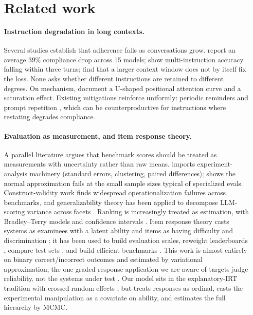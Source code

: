 \documentclass{llncs}
\begin{document}
\section{Related work}
\label{sec:related}

\paragraph{Instruction degradation in long contexts.}
Several studies establish that adherence falls as conversations grow.
\textcite{laban2025} report an average 39\% compliance drop across 15
models; \textcite{he2024} show multi-instruction accuracy falling within
three turns; \textcite{du2025} find that a larger context window does not by
itself fix the loss. None asks whether different instructions are retained
to different degrees. On mechanism, \textcite{liu2024} document a U-shaped
positional attention curve and \textcite{mu2025} a saturation effect.
Existing mitigations reinforce uniformly: periodic reminders
\parencite{dongre2025} and prompt repetition \parencite{leviathan2025},
which can be counterproductive for instructions where restating degrades
compliance.

\paragraph{Evaluation as measurement, and item response theory.}
A parallel literature argues that benchmark scores should be treated as
measurements with uncertainty rather than raw means.
\textcite{miller2024errorbars} imports experiment-analysis machinery
(standard errors, clustering, paired differences); \textcite{bowyer2025clt}
shows the normal approximation fails at the small sample sizes typical of
specialized evals. Construct-validity work \parencite{bean2025construct}
finds widespread operationalization failures across benchmarks, and
generalizability theory has been applied to decompose LLM-scoring variance
across facets \parencite{song2025gtheory, brennan2001gtheory}. Ranking is
increasingly treated as estimation, with Bradley--Terry models and
confidence intervals \parencite{chiang2024arena}. Item response theory
casts systems as examinees with a latent ability and items as having
difficulty and discrimination \parencite{lalor2016irt,
deboeck2004explanatory, samejima1969grm}; it has been used to build
evaluation scales, reweight leaderboards
\parencite{rodriguez2021leaderboards}, compare test sets
\parencite{vania2021testsets}, and build efficient benchmarks
\parencite{polo2024tinybenchmarks}. This work is almost entirely on binary
correct/incorrect outcomes and estimated by variational approximation; the
one graded-response application we are aware of targets judge reliability,
not the systems under test \parencite{choi2026judgeirt}. Our model sits in
the explanatory-IRT tradition \parencite{deboeck2004explanatory} with
crossed random effects \parencite{baayen2008crossed}, but treats responses
as ordinal, casts the experimental manipulation as a covariate on ability,
and estimates the full hierarchy by MCMC.
\end{document}
